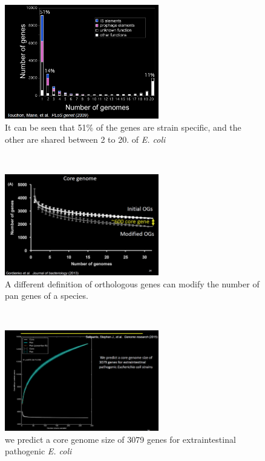 \\

\begin{figure}[h]
\caption{It can be seen that 51\% of the genes are strain specific, and the other are shared between 2 to 20.  of \emph{E. coli}}
\centering
\includegraphics[width=0.6\textwidth]{genesSharedDifferentGenomes}
\end{figure}

\\

\begin{figure}[h]
\caption{A different definition of orthologous genes can modify the number of pan genes of a species. }
\centering
\includegraphics[width=0.6\textwidth]{orthologGenes}
\end{figure}

\\

\begin{figure}[h]
\caption{we predict a core genome size of 3079 genes for extraintestinal pathogenic \emph{E. coli}}
\centering
\includegraphics[width=0.6\textwidth]{coreGenomePredict}
\end{figure}

